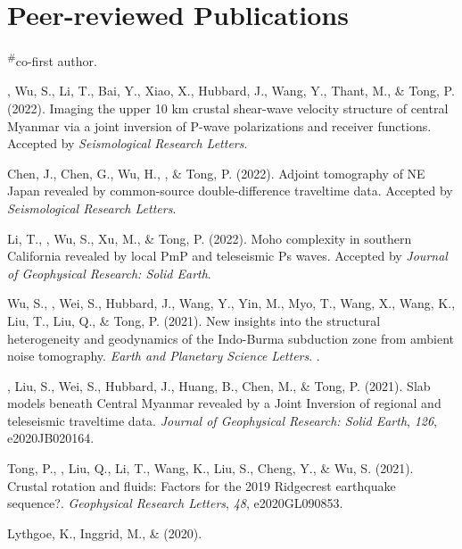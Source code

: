\newcommand{\CS}{*} %
\newcommand{\CF}{\textsuperscript{\#}} %

\section*{Peer-reviewed Publications}
\CF co-first author.

\begin{etaremune}
\item
    \Yao, Wu, S., Li, T., Bai, Y., Xiao, X., Hubbard, J., Wang, Y., Thant, M., \& Tong, P. (2022).
    Imaging the upper 10 km crustal shear-wave velocity structure of central Myanmar via a joint inversion of P-wave polarizations and receiver functions.
    Accepted by \textit{Seismological Research Letters}.
\item
    Chen, J., Chen, G., Wu, H., \Yao, \& Tong, P. (2022).
    Adjoint tomography of NE Japan revealed by common-source double-difference traveltime data.
    Accepted by \textit{Seismological Research Letters}.
\item
    Li, T., \Yao, Wu, S., Xu, M., \& Tong, P. (2022).
    Moho complexity in southern California revealed by local PmP and teleseismic Ps waves.
    Accepted by \textit{Journal of Geophysical Research: Solid Earth}.
\item
    Wu, S., \Yao, Wei, S., Hubbard, J., Wang, Y., Yin, M., Myo, T., Wang, X., Wang, K., Liu, T., Liu, Q., \& Tong, P. (2021).
    New insights into the structural heterogeneity and geodynamics of the Indo-Burma subduction zone from ambient noise tomography.
    \textit{Earth and Planetary Science Letters}.
    .
\item
    \Yao, Liu, S., Wei, S., Hubbard, J., Huang, B., Chen, M., \& Tong, P. (2021).
    Slab models beneath Central Myanmar revealed by a Joint Inversion of regional and teleseismic traveltime data.
    \textit{Journal of Geophysical Research: Solid Earth}, \textit{126}, e2020JB020164.
\item
    Tong, P., \Yao, Liu, Q., Li, T., Wang, K., Liu, S., Cheng, Y., \& Wu, S. (2021).
    Crustal rotation and fluids: Factors for the 2019 Ridgecrest earthquake sequence?.
    \textit{Geophysical Research Letters}, \textit{48}, e2020GL090853.
\item
    Lythgoe, K., Inggrid, M., \& \Yao (2020).

\end{etaremune}
